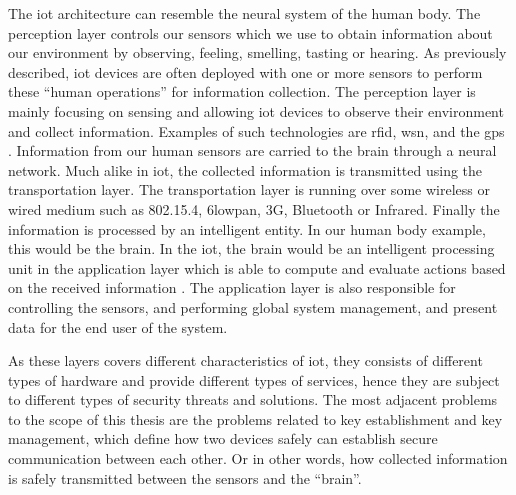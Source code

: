 The \gls{iot} architecture can resemble the neural system of the human body. The perception layer controls our sensors which we use to obtain information about our environment by observing, feeling, smelling, tasting or hearing. As previously described, \gls{iot} devices are often deployed with one or more sensors to perform these ``human operations'' for information collection. The perception layer is mainly focusing on sensing and allowing \gls{iot} devices to observe their environment and collect information. Examples of such technologies are \gls{rfid}, \gls{wsn}, and the \gls{gps} \citep{Jing2014}. Information from our human sensors are carried to the brain through a neural network. Much alike in \gls{iot}, the collected information is transmitted using the transportation layer. The transportation layer is running over some wireless or wired medium such as 802.15.4, \gls{6lowpan}, 3G, Bluetooth or Infrared. Finally the information is processed by an intelligent entity. In our human body example, this would be the brain. In the \gls{iot}, the brain would be an intelligent processing unit in the application layer which is able to compute and evaluate actions based on the received information \cite{iot-layers2012} \cite{iot-layers2010}. The application layer is also responsible for controlling the sensors, and performing global system management, and present data for the end user of the system.

As these layers covers different characteristics of \gls{iot}, they consists of different types of hardware and provide different types of services, hence they are subject to different types of security threats and solutions. The most adjacent problems to the scope of this thesis are the problems related to key establishment and key management, which define how two devices safely can establish secure communication between each other. Or in other words, how collected information is safely transmitted between the sensors and the ``brain''. 





